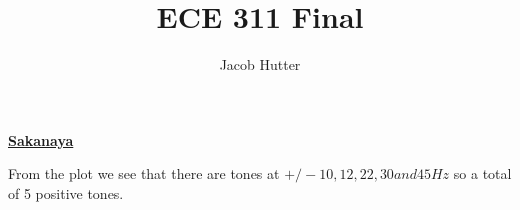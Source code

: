 \documentclass{article}
\author{Jacob Hutter}
\title{ECE 311 Final}
\begin{document}
\maketitle

\color{red}
\underline{\textbf{Sakanaya}}
\color{black}


\begin{center}
\end{center}
From the plot we see that there are tones at $+/- 10,12,22,30 and 45 Hz$ so a total of 5 positive tones.

\clearpage
\end{document}
